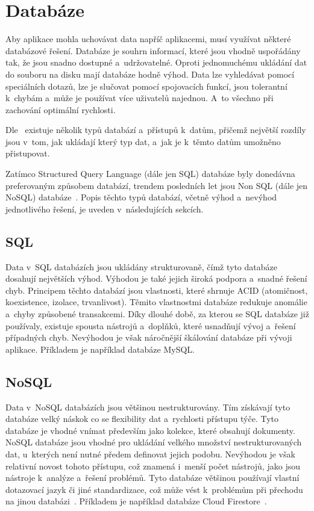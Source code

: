 \section{Databáze}

Aby aplikace mohla uchovávat data napříč aplikacemi,
musí využívat některé databázové řešení.
Databáze je souhrn informací,
které jsou vhodně uspořádány tak,
že jsou snadno dostupné a~udržovatelné.
Oproti jednomuchému ukládání dat do souboru na disku mají databáze hodně výhod.
Data lze vyhledávat pomocí speciálních dotazů,
lze je slučovat pomocí spojovacích funkcí,
jsou tolerantní k~chybám
a~může je používat více uživatelů najednou.
A~to všechno při zachování optimální rychlosti.~\cite{database}

Dle~\cite{sql_nosql} existuje několik typů databází a~přístupů k~datům,
přičemž největší rozdíly jsou v~tom,
jak ukládají který typ dat,
a~jak je k~těmto datům umožněno přistupovat.
\emph{}~\cite{sql_nosql}

Zatímco Structured Query Language (dále jen SQL) databáze byly donedávna
preferovaným způsobem databází,
trendem posledních let jsou Non SQL (dále jen NoSQL) databáze~\cite{sql_nosql}.
Popis těchto typů databází,
včetně výhod a~nevýhod jednotlivého řešení,
je uveden v~následujících sekcích.

\subsection{SQL}

Data v~SQL databázích jsou ukládány strukturovaně,
čímž tyto databáze dosahují největších výhod.
Výhodou je také jejich široká podpora a~snadné řešení chyb.
Principem těchto databází jsou vlastnosti,
které shrnuje ACID (atomičnost, koexistence, izolace, trvanlivost).
Těmito vlastnostmi databáze redukuje anomálie a~chyby způsobené transakcemi.
Díky dlouhé době,
za kterou se SQL databáze již používaly,
existuje spousta nástrojů a~doplňků,
které usnadňují vývoj a~řešení případných chyb.
Nevýhodou je však náročnější škálování databáze při vývoji aplikace.
Příkladem je například databáze MySQL.~\cite{sql_nosql}

\subsection{NoSQL}

Data v~NoSQL databázích jsou většinou nestrukturovány.
Tím získávají tyto databáze velký náskok co se flexibility dat a~rychlosti
přístupu týče.
Tyto databáze je vhodné vnímat především jako kolekce,
které obsahují dokumenty. 
NoSQL databáze jsou vhodné pro ukládání velkého množství nestrukturovaných dat,
u~kterých není nutné předem definovat jejich podobu.
Nevýhodou je však relativní novost tohoto přístupu,
což znamená i~menší počet nástrojů,
jako jsou nástroje k~analýze a~řešení problémů.
Tyto databáze většinou používají vlastní dotazovací jazyk či jiné standardizace,
což může vést k~problémům při přechodu na jinou databázi~\cite{sql_nosql}.
Příkladem je například databáze Cloud Firestore~\cite{cloud_firestore}.

